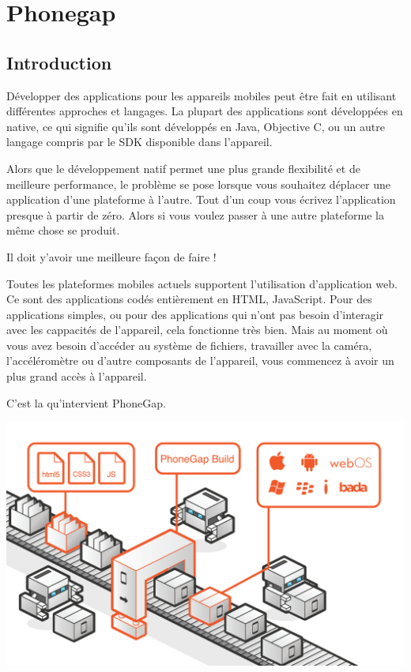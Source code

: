 \section{Phonegap}
\label{ch:phonegap}

\subsection{Introduction}

Développer des applications pour les appareils mobiles peut être fait en utilisant différentes approches et langages. La plupart des applications sont développées en native, ce qui signifie qu’ils sont développés en Java, Objective C, ou un autre langage compris par le SDK disponible dans l’appareil.

Alors que le développement natif permet une plus grande flexibilité et de meilleure performance, le problème se pose lorsque vous souhaitez déplacer une application d’une plateforme à l’autre. Tout d’un coup vous écrivez l’application presque à partir de zéro. Alors si vous voulez passer à une autre plateforme la même chose se produit.

Il doit y’avoir une meilleure façon de faire !

Toutes les plateformes mobiles actuels supportent l’utilisation d’application web. Ce sont des applications codés entièrement en HTML, JavaScript. Pour des applications simples, ou pour des applications qui n’ont pas besoin d’interagir avec les cappacités de l’appareil, cela fonctionne très bien. Mais au moment où vous avez besoin d’accéder au système de fichiers, travailler avec la caméra, l’accéléromètre ou d’autre composants de l’appareil, vous commencez à avoir un plus grand accès à l’appareil.

C’est la qu’intervient PhoneGap.


\begin{center}
\includegraphics[width=14cm]{img/phonegap.png}
\label{Plateforme Wakanda}
\end{center}


